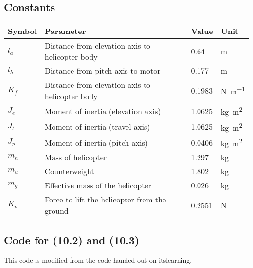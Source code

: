 \subsection{Constants}
\begin{center}
\begin{tabular}{l l l l}
\hline
Symbol & Parameter & Value & Unit \\ \hline
$l_a$ & Distance from elevation axis to helicopter body & 0.64 & m \\
$l_h$ & Distance from pitch axis to motor & 0.177 & m \\
$K_f$ & Distance from elevation axis to helicopter body & 0.1983 &\si{\newton \per \meter}  \\
$J_e$ & Moment of inertia (elevation axis) & 1.0625 & \si{\kilogram \meter \squared}  \\
$J_t$ & Moment of inertia (travel axis) & 1.0625 & \si{\kilogram \meter \squared}  \\
$J_p$ & Moment of inertia (pitch axis) & 0.0406 & \si{\kilogram \meter \squared}  \\
$m_h$ & Mass of helicopter & 1.297 &\si{\kilogram}  \\
$m_w$ & Counterweight & 1.802 & \si{\kilogram} \\
$m_g$ & Effective mass of the helicopter & 0.026 & \si{\kilogram} \\
$K_p$ & Force to lift the helicopter from the ground & 0.2551 & \si{\newton}
\end{tabular}
\end{center}
\label{table:constants}

\subsection{Code for (10.2) and (10.3)}

This code is modified from the code handed out on itslearning.

